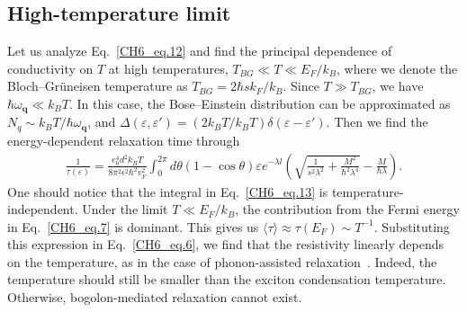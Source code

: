 \subsection{High-temperature limit}
Let us analyze Eq.~\eqref{CH6_eq.12} and find the principal dependence of conductivity on $T$ at high temperatures, $T_{BG} \ll T \ll E_F/k_B$, where we denote the Bloch--Gr\"uneisen temperature as $T_{BG}=2\hbar sk_F/k_B$.
Since $T \gg T_{BG}$, we have $\hbar \omega_{\mathbf{q}} \ll k_B T$.
In this case, the Bose--Einstein distribution can be approximated as $N_q \sim k_B T / \hbar \omega_\mathbf{q}$, and $\Delta\left(\varepsilon,\varepsilon'\right) = \left( 2k_B T / k_B T \right) \delta\left( \varepsilon -\varepsilon' \right)$.
Then we find the energy-dependent relaxation time through
%
\begin{eqnarray} \label{CH6_eq.13}
\frac{1}{\tau\left(\varepsilon\right)} = \frac{e_0^4d^2k_BT}{8\pi^2\epsilon^2\hbar^2v_F^2} \int^{2\pi}_0 d\theta \left( 1- \cos\theta\right) \varepsilon e^{-\lambda l}\left( \sqrt{ \frac{1}{s^2 \lambda^2} + \frac{M^2}{\hbar^2 \lambda^4}} -\frac{M}{\hbar \lambda} \right).
\end{eqnarray}
%
One should notice that the integral in Eq.~\eqref{CH6_eq.13} is temperature-independent.
%
Under the limit $T\ll E_F/k_B$, the contribution from the Fermi energy in Eq.~\eqref{CH6_eq.7} is dominant.
This gives us $\langle \tau \rangle \approx \tau\left(E_F\right)\sim T^{-1}$. Substituting this expression in Eq.~\eqref{CH6_eq.6}, we find that the resistivity linearly depends on the temperature, as in the case of phonon-assisted relaxation~\cite{Hwang:2008aa}.
%
Indeed, the temperature should still be smaller than the exciton condensation temperature. Otherwise, bogolon-mediated relaxation cannot exist.

%
%
